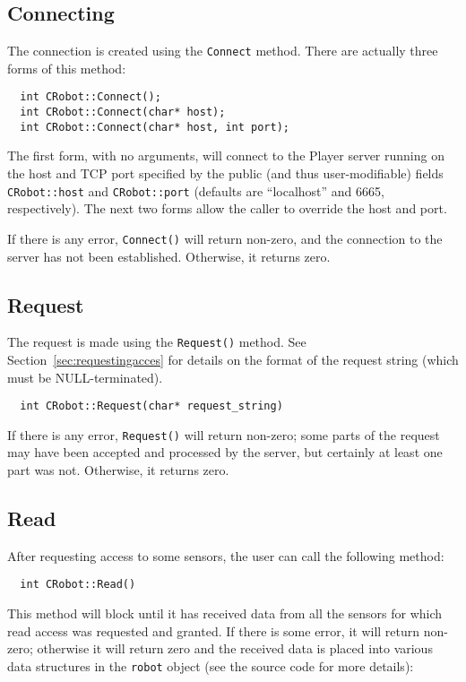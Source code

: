 \documentclass[11pt]{article}
\begin{document}
\subsection{Connecting}

The connection is created using
the {\tt Connect} method. There are actually three forms of this
method:

\begin{verbatim}
  int CRobot::Connect();
  int CRobot::Connect(char* host);
  int CRobot::Connect(char* host, int port);
\end{verbatim}

The first form, with no arguments, will connect to the Player server running
on the host and TCP port specified by the public (and thus user-modifiable) 
fields {\tt CRobot::host} and 
{\tt CRobot::port} (defaults are ``localhost'' and 6665, respectively).  
The next two forms allow the caller to override the host and port.

If there is any error, {\tt Connect()} will return non-zero, and
the connection to the server has not been established.  Otherwise,
it returns zero.


\subsection{Request}

The request is made using the {\tt Request()}
method. See Section~\ref{sec:requestingacces}
for details on the format of the request string (which must be
NULL-terminated).
\begin{verbatim}
  int CRobot::Request(char* request_string)
\end{verbatim}

If there is any error, {\tt Request()} will return non-zero;
some parts of the request may have been accepted and processed
by the server, but certainly at
least one part was not.  Otherwise, it returns zero.


\subsection{Read}

After requesting access to some sensors, the user can call the following
method:

\begin{verbatim}
  int CRobot::Read()
\end{verbatim}

This method will block until it has received data from all the sensors
for which read access was requested and granted.  If there
is some error, it will return non-zero; otherwise it will
return zero and the received data is placed
into various data structures in the {\tt robot} object (see the source
code for more details):
\end{document}
